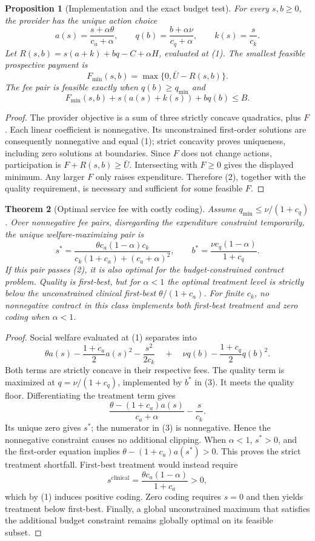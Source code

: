 \documentclass[11pt]{article}
\newtheorem{theorem}{Theorem}
\newtheorem{proposition}[theorem]{Proposition}
\theoremstyle{definition}
\begin{document}
\begin{proposition}[Implementation and the exact budget test]
For every $s,b\geq0$, the provider has the unique action choice
\[
 a(s)=\frac{s+\alpha\theta}{c_a+\alpha},\qquad
 q(b)=\frac{b+\alpha\nu}{c_q+\alpha},\qquad
 k(s)=\frac{s}{c_k}.
 \tag{1}
\]
Let $R(s,b)=s(a+k)+bq-C+\alpha H$, evaluated at (1). The smallest feasible prospective payment is
\[
 F_{\min}(s,b)=\max\{0,\bar U-R(s,b)\}.
\]
The fee pair is feasible exactly when $q(b)\geq q_{\min}$ and
\[
 F_{\min}(s,b)+s(a(s)+k(s))+bq(b)\leq B.
 \tag{2}
\]
\end{proposition}
\begin{proof}
The provider objective is a sum of three strictly concave quadratics, plus $F$. Each linear coefficient is nonnegative. Its unconstrained first-order solutions are consequently nonnegative and equal (1); strict concavity proves uniqueness, including zero solutions at boundaries. Since $F$ does not change actions, participation is $F+R(s,b)\geq\bar U$. Intersecting with $F\geq0$ gives the displayed minimum. Any larger $F$ only raises expenditure. Therefore (2), together with the quality requirement, is necessary and sufficient for some feasible $F$.
\end{proof}

\begin{theorem}[Optimal service fee with costly coding]
Assume $q_{\min}\leq\nu/(1+c_q)$. Over nonnegative fee pairs, disregarding the expenditure constraint temporarily, the unique welfare-maximizing pair is
\[
 s^*=\frac{\theta c_a(1-\alpha)c_k}
 {c_k(1+c_a)+(c_a+\alpha)^2},\qquad
 b^*=\frac{\nu c_q(1-\alpha)}{1+c_q}.
 \tag{3}
\]
If this pair passes (2), it is also optimal for the budget-constrained contract problem. Quality is first-best, but for $\alpha<1$ the optimal treatment level is strictly below the unconstrained clinical first-best $\theta/(1+c_a)$. For finite $c_k$, no nonnegative contract in this class implements both first-best treatment and zero coding when $\alpha<1$.
\end{theorem}
\begin{proof}
Social welfare evaluated at (1) separates into
\[
 \theta a(s)-\frac{1+c_a}{2}a(s)^2-\frac{s^2}{2c_k}
 \quad+\quad
 \nu q(b)-\frac{1+c_q}{2}q(b)^2.
\]
Both terms are strictly concave in their respective fees. The quality term is maximized at $q=\nu/(1+c_q)$, implemented by $b^*$ in (3). It meets the quality floor. Differentiating the treatment term gives
\[
 \frac{\theta-(1+c_a)a(s)}{c_a+\alpha}-\frac{s}{c_k}.
\]
Its unique zero gives $s^*$; the numerator in (3) is nonnegative. Hence the nonnegative constraint causes no additional clipping. When $\alpha<1$, $s^*>0$, and the first-order equation implies $\theta-(1+c_a)a(s^*)>0$. This proves the strict treatment shortfall. First-best treatment would instead require
\[
 s^{\mathrm{clinical}}=\frac{\theta c_a(1-\alpha)}{1+c_a}>0,
\]
which by (1) induces positive coding. Zero coding requires $s=0$ and then yields treatment below first-best. Finally, a global unconstrained maximum that satisfies the additional budget constraint remains globally optimal on its feasible subset.
\end{proof}
\end{document}
